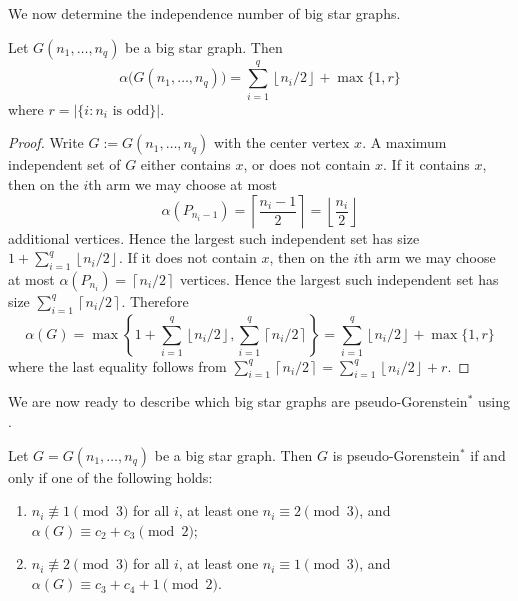 \documentclass[12pt]{amsart}
\theoremstyle{plain}
\theoremstyle{definition}
\begin{document}
We now determine the independence number of big star graphs.


\begin{lem}\label{lem:alpha_big_star}
Let $G(n_1,\ldots,n_q)$ be a big star graph. Then
\[
\alpha\bigl(G(n_1,\ldots,n_q)\bigr)
=
\sum_{i=1}^q \left\lfloor n_i/2\right\rfloor+\max\{1,r\}
\]
where  \(r=|\{ i : n_i \text{ is odd} \}|\).
\end{lem}

\begin{proof}
Write $G:=G(n_1,\ldots,n_q)$ with the center vertex $x$.  A maximum independent set of $G$ either contains $x$, or does not contain $x$. If it contains $x$, then on the $i$th arm we may choose at most
\[
\alpha(P_{n_i-1})=\left\lceil \frac{n_i-1}{2}\right\rceil=\left\lfloor \frac{n_i}{2}\right\rfloor
\]
additional vertices. Hence the largest such independent set has size \(1+\sum_{i=1}^q \left\lfloor n_i/2\right\rfloor\). If it does not contain $x$, then on the $i$th arm we may choose at most \(\alpha(P_{n_i})=\left\lceil n_i/2\right\rceil\)
vertices. Hence the largest such independent set has size \(\sum_{i=1}^q \left\lceil n_i/2\right\rceil\). Therefore
\[
\alpha(G)
=
\max\left\{
1+\sum_{i=1}^q \left\lfloor n_i/2\right\rfloor, 
\sum_{i=1}^q \left\lceil n_i/2\right\rceil
\right\}=
\sum_{i=1}^q \left\lfloor n_i/2\right\rfloor+\max\{1,r\}
\]
where the last equality follows from  \(\sum_{i=1}^q \left\lceil n_i/2\right\rceil
=
\sum_{i=1}^q \left\lfloor n_i/2\right\rfloor+r\).
\end{proof}



We are now ready to describe which big star graphs are pseudo-Gorenstein\(^*\) using .


\begin{cor}\label{cor:pseudogorenstein_star_big_star}
Let \(G=G(n_1,\ldots,n_q)\) be a big star graph.
Then \(G\) is pseudo-Gorenstein\(^*\) if and only if one of the following holds:

\begin{enumerate}
    \item \(n_i\not\equiv 1\pmod 3\) for all \(i\), at least one \(n_i\equiv 2\pmod 3\), and
    \(
    \alpha(G)
    \equiv
    c_2+c_3
    \pmod 2\);
    \item \(n_i\not\equiv 2\pmod 3\) for all \(i\), at least one \(n_i\equiv 1\pmod 3\), and
    \(
\alpha(G)
    \equiv
    c_3+c_4+1
    \pmod 2\).
\end{enumerate}
\end{cor}
\end{document}
